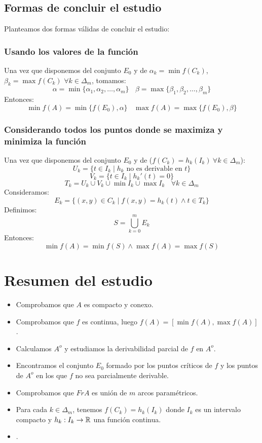 \subsection{Formas de concluir el estudio}
\label{formasEstudio}
\noindent
Planteamos dos formas válidas de concluir el estudio:

\subsubsection{Usando los valores de la función}
\noindent
Una vez que disponemos del conjunto $E_0$ y de $\alpha_k = \min{f(C_k)}$, $\beta_k = \max{f(C_k)}$ $\forall k \in \Delta_m$, tomamos:
$$\alpha = \min\{\alpha_1, \alpha_2, \ldots, \alpha_m\}~~~~\beta = \max\{\beta_1, \beta_2, \ldots, \beta_m\}$$
Entonces:
$$\min{f(A)} = \min\{f(E_0), \alpha\}~~~~\max{f(A)} = \max\{f(E_0), \beta\}$$

\subsubsection{Considerando todos los puntos donde se maximiza y minimiza la función}
Una vez que disponemos del conjunto $E_0$ y de ($f(C_k) = h_k(I_k) ~\forall k \in \Delta_m$):
$$U_k = \{t \in I_k \mid h_k \mbox{ no es derivable en } t\}$$
$$V_k = \{t \in I_k \mid h_k'(t) = 0 \}$$
$$T_k = U_k \cup V_k \cup \min{I_k} \cup \max{I_k}~~~~\forall k \in \Delta_m$$
Consideramos:
$$E_k = \{(x,y) \in C_k \mid f(x,y) = h_k(t) \land t \in T_k \}$$
Definimos:
$$S = \bigcup\limits_{k=0}^m E_k$$
Entonces:
$$\min{f(A)} = \min{f(S)} \land \max{f(A)} = \max{f(S)}$$

\section{Resumen del estudio}
\begin{itemize}
    \item Comprobamos que $A$ es compacto y conexo.
    \item Comprobamos que $f$ es continua, luego $f(A) = [\min f(A), \max f(A)]$.
    \item Calculamos $A^o$ y estudiamos la derivabilidad parcial de $f$ en $A^o$.
    \item Encontramos el conjunto $E_0$ formado por los puntos críticos de $f$ y los puntos de $A^o$ en los que $f$ no sea parcialmente derivable.
    \item Comprobamos que $FrA$ es unión de $m$ arcos paramétricos.
    \item Para cada $k \in \Delta_m$, tenemos $f(C_k) = h_k(I_k)$ donde $I_k$ es un intervalo compacto y $h_k:I_k \rightarrow \mathbb R$ una función continua.
    \item {}.
\end{itemize}

